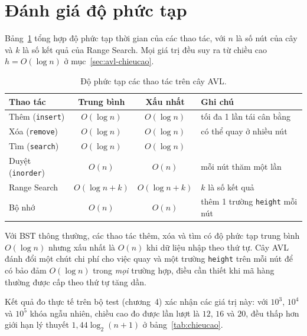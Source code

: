 \section{Đánh giá độ phức tạp}\label{sec:avl-dophuctap}

Bảng~\ref{tab:phuctap} tổng hợp độ phức tạp thời gian của các thao tác, với $n$ là
số nút của cây và $k$ là số kết quả của Range Search. Mọi giá trị đều suy ra từ
chiều cao $h = O(\log n)$ ở mục~\ref{sec:avl-chieucao}.

\begin{table}[htbp]
\centering
\begin{tabular}{|l|c|c|l|}
\hline
Thao tác & Trung bình & Xấu nhất & Ghi chú \\
\hline
Thêm (\texttt{insert})       & $O(\log n)$     & $O(\log n)$     & tối đa 1 lần tái cân bằng \\
Xóa (\texttt{remove})        & $O(\log n)$     & $O(\log n)$     & có thể quay ở nhiều nút \\
Tìm (\texttt{search})        & $O(\log n)$     & $O(\log n)$     & \\
Duyệt (\texttt{inorder})     & $O(n)$          & $O(n)$          & mỗi nút thăm một lần \\
Range Search                 & $O(\log n + k)$ & $O(\log n + k)$ & $k$ là số kết quả \\
Bộ nhớ                       & $O(n)$          & $O(n)$          & thêm 1 trường \texttt{height} mỗi nút \\
\hline
\end{tabular}
\caption{Độ phức tạp các thao tác trên cây AVL.}
\label{tab:phuctap}
\end{table}

Với BST thông thường, các thao tác thêm, xóa và tìm có độ phức tạp trung bình
$O(\log n)$ nhưng xấu nhất là $O(n)$ khi dữ liệu nhập theo thứ tự. Cây AVL đánh đổi
một chút chi phí cho việc quay và một trường \texttt{height} trên mỗi nút để có
bảo đảm $O(\log n)$ trong \emph{mọi} trường hợp, điều cần thiết khi mã hàng thường
được cấp theo thứ tự tăng dần.

Kết quả đo thực tế trên bộ test (chương~4) xác nhận các giá trị này: với $10^3$,
$10^4$ và $10^5$ khóa ngẫu nhiên, chiều cao đo được lần lượt là $12$, $16$ và $20$,
đều thấp hơn giới hạn lý thuyết $1{,}44\log_2(n+1)$ ở bảng~\ref{tab:chieucao}.
